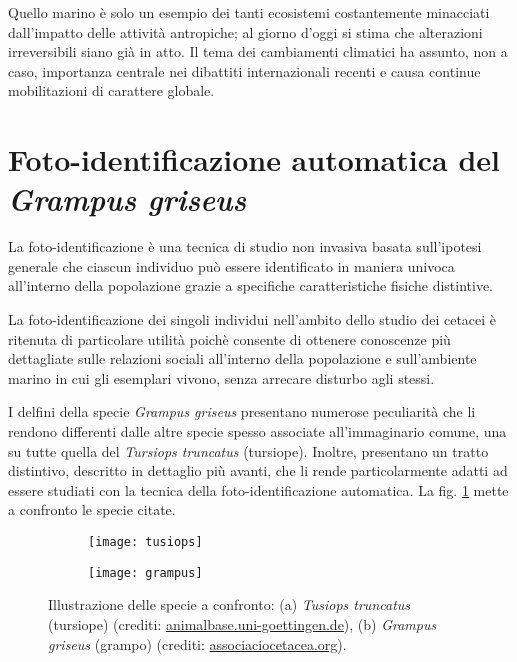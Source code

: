Quello marino è solo un esempio dei tanti ecosistemi costantemente minacciati dall'impatto delle attività antropiche; al giorno d'oggi si stima che alterazioni irreversibili siano già in atto. Il tema dei cambiamenti climatici ha assunto, non a caso, importanza centrale nei dibattiti internazionali recenti e causa continue mobilitazioni di carattere globale.


\section{Foto-identificazione automatica del \\\textit{Grampus griseus}}
\label{fotoidentificazione}
La foto-identificazione è una tecnica di studio non invasiva basata sull'ipotesi generale che ciascun individuo può essere identificato in maniera univoca all'interno della popolazione grazie a specifiche caratteristiche fisiche distintive.

La foto-identificazione dei singoli individui nell'ambito dello studio dei cetacei è ritenuta di particolare utilità poichè consente di ottenere conoscenze più dettagliate sulle relazioni sociali all'interno della popolazione e sull'ambiente marino in cui gli esemplari vivono, senza arrecare disturbo agli stessi.

I delfini della specie \textit{Grampus griseus} presentano numerose peculiarità che li rendono differenti dalle altre specie spesso associate all'immaginario comune, una su tutte quella del \textit{Tursiops truncatus} (tursiope). Inoltre, presentano un tratto distintivo, descritto in dettaglio più avanti, che li rende particolarmente adatti ad essere studiati con la tecnica della foto-identificazione automatica. La fig. \ref{fig:delfini} mette a confronto le specie citate.

\begin{figure}[h!]
	\centering
	\begin{subfigure}[b]{0.45\textwidth}
	\texttt{[image: tusiops]}
	\caption{}
	\end{subfigure}
	\begin{subfigure}[b]{0.45\textwidth}
	\texttt{[image: grampus]}
	\caption{}
	\end{subfigure}
	\caption{Illustrazione delle specie a confronto: (a) \textit{Tusiops truncatus} (tursiope) (crediti: \protect\url{animalbase.uni-goettingen.de}), (b) \textit{Grampus griseus} (grampo) (crediti: \protect\url{associaciocetacea.org}).}
	\label{fig:delfini}
\end{figure}

